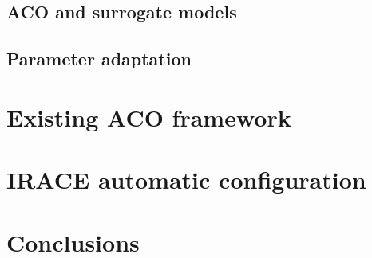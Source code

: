 \documentclass[12pt]{article}
\begin{document}
\subsection{ACO and surrogate models}

\subsection{Parameter adaptation}

\section{Existing ACO framework}

\section{IRACE automatic configuration}

\section{Conclusions}

\begin{thebibliography}{1}

\end{thebibliography}
\end{document}
